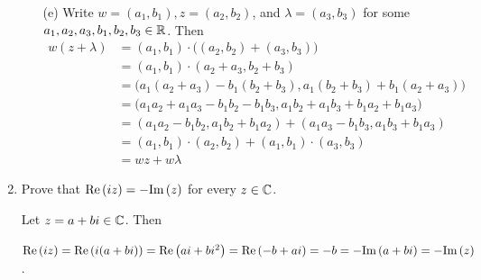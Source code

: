 \documentclass[11pt,fleqn,dvipsnames,usenames]{article}
\begin{document}
\begin{enumerate}
\begin{enumerate}[(a)]

\item[(e)] Write $w = (a_{1},b_{1}), z = (a_{2},b_{2})$, and $\lambda = (a_{3},b_{3})$ for some $a_{1},a_{2},a_{3},b_{1},b_{2},b_{3}\in\mathbb{R}$.  Then
\begin{align*}
w(z+\lambda) &= (a_{1},b_{1})\cdot \big((a_{2},b_{2}) + (a_{3},b_{3})\big)\\
&= (a_{1},b_{1})\cdot (a_{2}+a_{3},b_{2} + b_{3})\\
&= \big(a_{1}(a_{2} + a_{3}) - b_{1}(b_{2} + b_{3}), a_{1}(b_{2}+b_{3}) + b_{1}(a_{2}+a_{3})\big)\\
&= \big(a_{1}a_{2} + a_{1}a_{3} - b_{1}b_{2} - b_{1}b_{3}, a_{1}b_{2} + a_{1}b_{3} + b_{1}a_{2} + b_{1}a_{3}\big)\\
&= (a_{1}a_{2} - b_{1}b_{2},a_{1}b_{2} + b_{1}a_{2}) + (a_{1}a_{3} - b_{1}b_{3}, a_{1}b_{3} + b_{1}a_{3})\\
&= (a_{1},b_{1})\cdot(a_{2},b_{2}) + (a_{1},b_{1})\cdot (a_{3},b_{3})\\
&= wz + w\lambda
\end{align*}
\end{enumerate}

\item Prove that $\text{Re}\left(iz\right) = -\text{Im}\left(z\right)$ for every $z\in\mathbb{C}$.
\vsmsp

\solution Let $z = a+bi\in\mathbb{C}$.  Then
\begin{center}
$\text{Re}\left(iz\right) = \text{Re}\left(i(a+bi)\right) = \text{Re}\left(ai + bi^2\right) = \text{Re}\left(-b + ai\right) = -b = -\text{Im}\left(a+bi\right) = -\text{Im}\left(z\right)$.
\end{center}


\end{enumerate}
\end{document}
